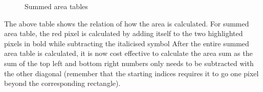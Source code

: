 \documentclass[twoside,a4paper,article]{combine}
\begin{document}
\begin{minipage}{\textwidth}\begin{figure}[H]
    \captionsetup{justification=centering}
    \centering
    \caption{Summed area tables\cite{Szeliski_2022}}
    \label{fig:graph}
\end{figure}\end{minipage}
The above table shows the relation of how the area is calculated. For summed area table, the red pixel is calculated by adding itself to the
two highlighted pixels in bold while subtracting the italicised symbol After the entire summed area table is calculated, it is now
cost effective to calculate the area sum as the sum of the top left and bottom right numbers only needs to be subtracted with the other diagonal (remember that
the starting indices requires it to go one pixel beyond the corresponding rectangle).
\end{document}

